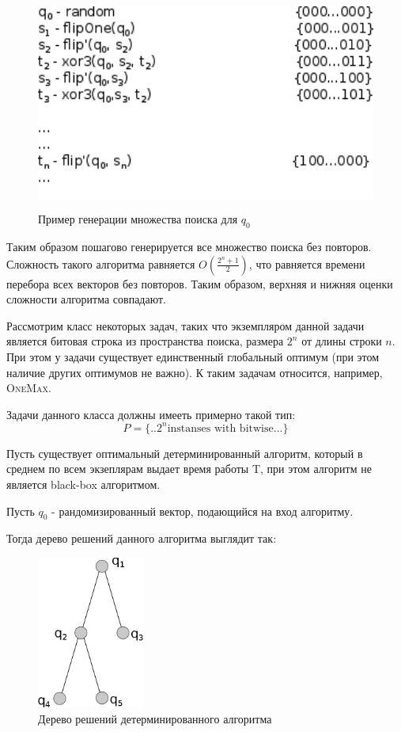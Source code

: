 \begin{figure}[H]
\centering
\includegraphics[height=7cm]{pic/tern0.png}
\caption{Пример генерации множества поиска для $q_0$}\label{fig2}
\end{figure}

Таким образом пошагово генерируется все множество поиска без повторов. Сложность такого алгоритма равняется $O(\frac{2^n + 1}{2})$, 
что равняется времени перебора всех векторов без повторов. Таким образом, верхняя и нижняя оценки сложности алгоритма совпадают. 

Рассмотрим класс некоторых задач, таких что экземпляром данной задачи является битовая строка из пространства поиска, размера $2^n$ от длины строки $n$. При этом у задачи существует единственный 
глобальный оптимум (при этом  наличие других оптимумов не важно). К таким задачам относится, например, \textsc{OneMax}.

Задачи данного класса должны имееть примерно такой тип:
$$P = \{..2^n \textrm{instanses with bitwise} ... \}$$

Пусть существует оптимальный детерминированный алгоритм, который в среднем по всем экзеплярам выдает время работы T, при этом алгоритм не является black-box алгоритмом. 

Пусть $q_0$ - рандомизированный вектор, подающийся на вход алгоритму.

Тогда дерево решений данного алгоритма выглядит так: 

\begin{figure}[H]
\centering
\includegraphics[height=5cm]{pic/graph1.png}
\caption{Дерево решений детерминированного алгоритма}
\end{figure}

